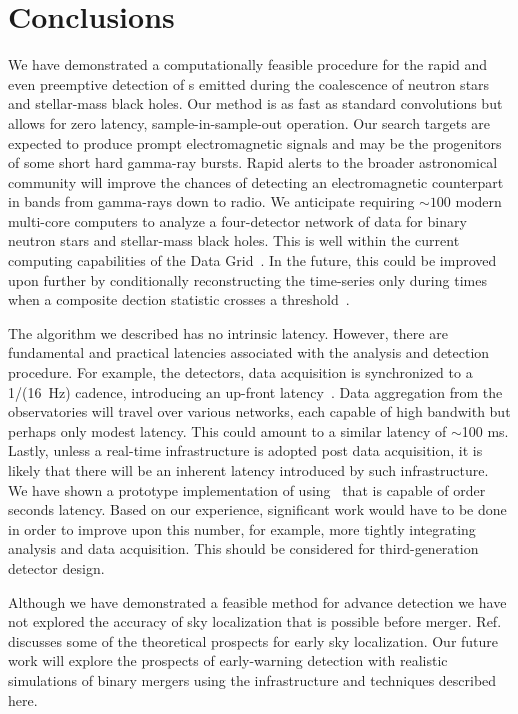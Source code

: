 \section{Conclusions}
\label{SECV}\label{sec:conclusions}

We have demonstrated a computationally feasible procedure for the rapid and
even preemptive detection of \GW{}s emitted during the coalescence
of neutron stars and stellar-mass black holes. Our method is as fast as
standard \fft{} convolutions but allows for zero latency, sample-in-sample-out
operation.  Our search targets are expected to produce prompt electromagnetic
signals and may be the progenitors of some short hard gamma-ray bursts.  Rapid
alerts to the broader astronomical community will improve the chances of
detecting an electromagnetic counterpart in bands from gamma-rays down to
radio.  We anticipate requiring $\sim100$ modern multi-core computers to
analyze a four-detector network of \GW{} data for binary neutron
stars and stellar-mass black holes.  This is well within the current computing
capabilities of the \LIGO{} Data Grid~\cite{LDG}. In the future, this could be
improved upon further by conditionally reconstructing the \SNR{} time-series
only during times when a composite dection statistic crosses a
threshold~\cite{svd-compdetstat}.

The algorithm we described has no intrinsic latency.  However, there are
fundamental and practical latencies associated with the analysis and detection
procedure. For example, the \LIGO{} detectors, data acquisition is synchronized
to a 1/(16~Hz) cadence, introducing an up-front latency~\cite{CITE_CDS}. Data
aggregation from
the observatories will travel over various networks, each capable of high
bandwith but perhaps only modest latency.  This could amount to a similar
latency of $\sim$100 ms.  Lastly, unless a real-time infrastructure is adopted
post data acquisition, it is likely that there will be an inherent latency
introduced by such infrastructure.  We have shown a prototype implementation
of \lloid{} using \gstlal\ that is capable of order seconds latency. Based
on our experience, significant work would have to be done in order to improve
upon this number, for example, more tightly integrating analysis and data
acquisition. This should be considered for third-generation detector design.

Although we have demonstrated a feasible method for advance detection we have
not explored the accuracy of sky localization that is possible before merger.
Ref.~\cite{Fairhurst2009} discusses some of the theoretical prospects for early sky
localization.  Our future work will explore the prospects of early-warning
detection with realistic simulations of binary mergers using the infrastructure
and techniques described here. 

